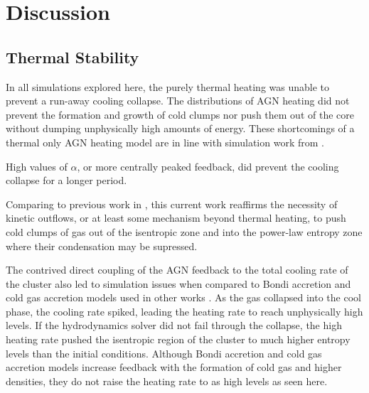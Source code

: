 \documentclass[iop,apjl, twocolappendix]{emulateapj}   %
\begin{document}

\section{Discussion}
\label{sec:discussion}

\subsection{Thermal Stability}
\label{sec:thermal_stability}

In all simulations explored here, the purely thermal heating was unable to
prevent a run-away cooling collapse. The distributions of AGN heating did not
prevent the formation and growth of cold clumps nor push them out of the core
without dumping unphysically high amounts of energy. These shortcomings of a
thermal only AGN heating model are in line with simulation work from
\citep{gaspari_agn_2011,meece_triggering_2017}.

High values of $\alpha$, or more centrally peaked feedback, did prevent the
cooling collapse for a longer period. 

Comparing to previous work in \citep{gaspari_agn_2011,meece_triggering_2017},
this current work reaffirms the necessity of kinetic outflows, or at least some
mechanism beyond thermal heating, to push cold clumps of gas out of the
isentropic zone and into the power-law entropy zone where their condensation
may be supressed.

The contrived direct coupling of the AGN feedback to the total cooling rate of
the cluster also led to simulation issues when compared to Bondi accretion and
cold gas accretion models used in other works \cite{meece_triggering_2017}. As
the gas collapsed into the cool phase, the cooling rate spiked, leading the
heating rate to reach unphysically high levels. If the hydrodynamics solver did
not fail through the collapse, the high heating rate pushed the isentropic
region of the cluster to much higher entropy levels than the initial
conditions. Although Bondi accretion and cold gas accretion models increase
feedback with the formation of cold gas and higher densities, they do not raise
the heating rate to as high levels as seen here.
\end{document}
